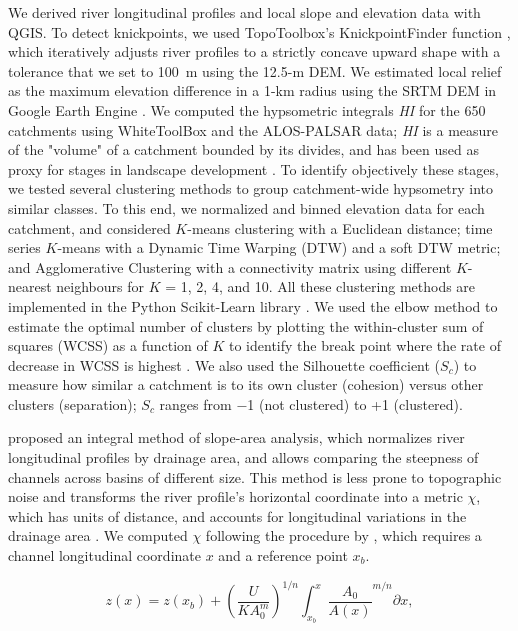 \documentclass[draft]{agujournal2019}
\begin{document}
\par We derived river longitudinal profiles and local slope and elevation data with QGIS. To detect knickpoints, we used TopoToolbox's KnickpointFinder function \cite{Schwanghart_2014}, which iteratively adjusts river profiles to a strictly concave upward shape with a tolerance that we set to 100~m using the 12.5-m DEM. We estimated local relief as the maximum elevation difference in a 1-km radius using the SRTM DEM in Google Earth Engine \cite{moore2011}. We computed the hypsometric integrals \textit{HI} for the 650 catchments using WhiteToolBox \cite{lindasy2014} and the ALOS-PALSAR data; \textit{HI} is a measure of the "volume" of a catchment bounded by its divides, and has been used as proxy for stages in landscape development \cite{Strahler1952, Gallen2011}. To identify objectively these stages, we tested several clustering methods to group catchment-wide hypsometry into similar classes. To this end, we normalized and binned elevation data for each catchment, and considered $K$-means clustering with a Euclidean distance; time series $K$-means with a Dynamic Time Warping (DTW) and a soft DTW metric; and Agglomerative Clustering with a connectivity matrix using different $K$-nearest neighbours for $K$ = 1, 2, 4, and 10. All these clustering methods are implemented in the Python Scikit-Learn library \cite{scikit-learn2011}. We used the elbow method to estimate the optimal number of clusters by plotting the within-cluster sum of squares (WCSS) as a function of $K$ to identify the break point where the rate of decrease in WCSS is highest \cite{thorndike1953}. We also used the Silhouette coefficient ($S_c$) \cite{rousseeuw1987} to measure how similar a catchment is to its own cluster (cohesion) versus other clusters (separation); $S_c$ ranges from $-$1 (not clustered) to +1 (clustered). 

\par {} proposed an integral method of slope-area analysis, which normalizes river longitudinal profiles by drainage area, and allows comparing the steepness of channels across basins of different size. This method is less prone to topographic noise and transforms the river profile’s horizontal coordinate into a metric $\chi$, which has units of distance, and accounts for longitudinal variations in the drainage area \cite{Mudd2014}. We computed $\chi$ following the procedure by , which requires a channel longitudinal coordinate $x$ and a reference point $x_b$. 

\begin{linenomath*}
\label{eq:chi}
\begin{equation}
    z(x)= z(x_b)+\left(\frac{U}{KA_0^m}\right)^{1/n}\int_{x_b}^{x} \frac{A_0}{A(x)}^{m/n} \partial{x},
\end{equation}
\end{linenomath*}
\end{document}

